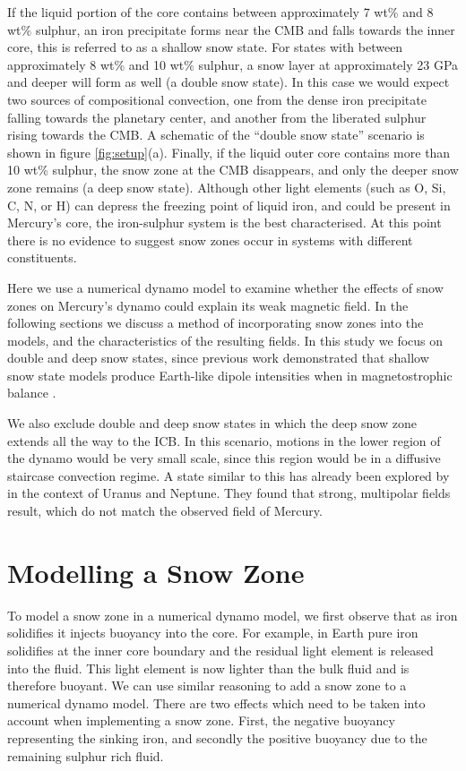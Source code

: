 If the liquid portion of the core contains between approximately 7 wt\% and 8 wt\% sulphur, an iron precipitate forms near the CMB and falls towards the inner core, this is referred to as a shallow snow state. For states with between approximately 8 wt\% and 10 wt\% sulphur, a snow layer at approximately 23 GPa and deeper will form as well (a double snow state). In this case we would expect two sources of compositional convection, one from the dense iron precipitate falling towards the planetary center, and another from the liberated sulphur rising towards the CMB. A schematic of the ``double snow state'' scenario is shown in figure \ref{fig:setup}(a). Finally, if the liquid outer core contains more than 10 wt\% sulphur, the snow zone at the CMB disappears, and only the deeper snow zone remains (a deep snow state). Although other light elements (such as O, Si, C, N, or H) can depress the freezing point of liquid iron, and could be present in Mercury's core, the iron-sulphur system is the best characterised. At this point there is no evidence to suggest snow zones occur in systems with different constituents. 

Here we use a numerical dynamo model to examine whether the effects of snow zones on Mercury's dynamo could explain its weak magnetic field. In the following sections we discuss a method of incorporating snow zones into the models, and the characteristics of the resulting fields. In this study we focus on double and deep snow states, since previous work demonstrated that shallow snow state models produce Earth-like dipole intensities when in magnetostrophic balance \citep{stanleyandmohammadi}.

We also exclude double and deep snow states in which the deep snow zone extends all the way to the ICB. In this scenario, motions in the lower region of the dynamo would be very small scale, since this region would be in a diffusive staircase convection regime. A state similar to this has already been explored by \citet{stanleyandbloxham2006} in the context of Uranus and Neptune. They found that strong, multipolar fields result, which do not match the observed field of Mercury.

\section{Modelling a Snow Zone}
To model a snow zone in a numerical dynamo model, we first observe that as iron solidifies it injects buoyancy into the core. For example, in Earth pure iron solidifies at the inner core boundary and the residual light element is released into the fluid. This light element is now lighter than the bulk fluid and is therefore buoyant. We can use similar reasoning to add a snow zone to a numerical dynamo model. There are two effects which need to be taken into account when implementing a snow zone. First, the negative buoyancy representing the sinking iron, and secondly the positive buoyancy due to the remaining sulphur rich fluid.

